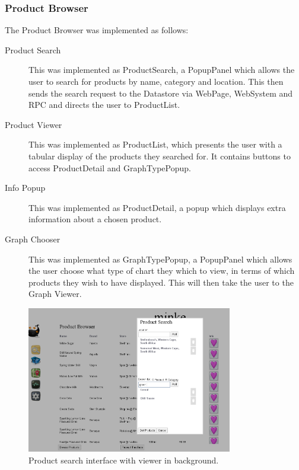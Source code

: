 \subsubsection{Product Browser}
The Product Browser was implemented as follows:
\begin{description}
\item[Product Search] This was implemented as ProductSearch, a PopupPanel which allows the user to 
search for products by name, category and location. This then sends the search request
 to the Datastore via WebPage, WebSystem and RPC and directs the user to
 ProductList.
 \item[Product Viewer]This was implemented as ProductList, which presents the
 user with a tabular display of the products they searched for. It contains buttons to access ProductDetail and GraphTypePopup.
\item[Info Popup] This was implemented as ProductDetail, a popup which displays
extra information about a chosen product.
\item[Graph Chooser] This was implemented as GraphTypePopup, a PopupPanel
which allows the user choose what type of chart they which to view, in terms of
which products they wish to have displayed. This will then take the user to
the Graph Viewer.
\end{description} 
\begin{figure}[h!]
\centering
\includegraphics[width=0.8\textwidth]{gwt-search.png}
\caption{Product search interface with viewer in background.}
\end{figure}